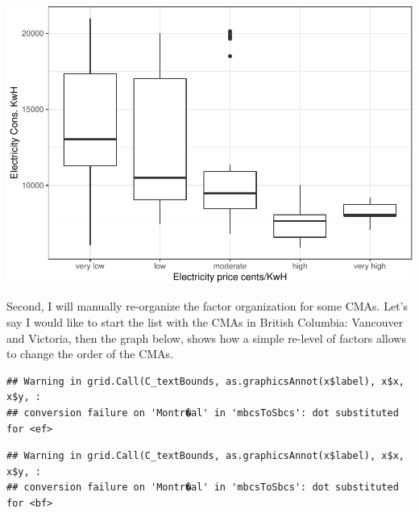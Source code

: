 \documentclass[]{article}
\newenvironment{Shaded}{\begin{snugshade}}{\end{snugshade}}
\newcommand{\KeywordTok}[1]{\textcolor[rgb]{0.13,0.29,0.53}{\textbf{#1}}}
\newcommand{\NormalTok}[1]{#1}
\newcommand{\OperatorTok}[1]{\textcolor[rgb]{0.81,0.36,0.00}{\textbf{#1}}}
\newcommand{\StringTok}[1]{\textcolor[rgb]{0.31,0.60,0.02}{#1}}
\begin{document}
\includegraphics{hw05_files/figure-latex/unnamed-chunk-9-1.pdf}

Second, I will manually re-organize the factor organization for some
CMAs. Let's say I would like to start the list with the CMAs in British
Columbia: Vancouver and Victoria, then the graph below, shows how a
simple re-level of factors allows to change the order of the CMAs.

\begin{Shaded}
\end{Shaded}

\begin{verbatim}
## Warning in grid.Call(C_textBounds, as.graphicsAnnot(x$label), x$x, x$y, :
## conversion failure on 'Montr�al' in 'mbcsToSbcs': dot substituted for <ef>
\end{verbatim}

\begin{verbatim}
## Warning in grid.Call(C_textBounds, as.graphicsAnnot(x$label), x$x, x$y, :
## conversion failure on 'Montr�al' in 'mbcsToSbcs': dot substituted for <bf>
\end{verbatim}
\end{document}
